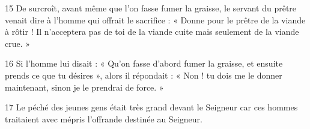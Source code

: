 
15 De surcroît, avant même que l’on fasse fumer la graisse, le servant du prêtre venait dire à l’homme qui offrait le sacrifice : « Donne pour le prêtre de la viande à rôtir ! Il n’acceptera pas de toi de la viande cuite mais seulement de la viande crue. »

16 Si l’homme lui disait : « Qu’on fasse d’abord fumer la graisse, et ensuite prends ce que tu désires », alors il répondait : « Non ! tu dois me le donner maintenant, sinon je le prendrai de force. »

17 Le péché des jeunes gens était très grand devant le Seigneur car ces hommes traitaient avec mépris l’offrande destinée au Seigneur.
